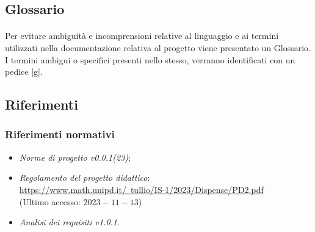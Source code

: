 \documentclass[10pt, a4paper]{article}
\begin{document}
\subsection{Glossario}
\paragraph{}Per evitare ambiguità e incomprensioni relative al linguaggio e ai termini utilizzati nella documentazione relativa al progetto viene presentato un Glossario. I termini ambigui o specifici presenti nello stesso, verranno identificati con un pedice |g|.
\subsection{Riferimenti}

\subsubsection{Riferimenti normativi} 
\begin{itemize}
\item \textit{Norme di progetto v0.0.1(23)};
\item \textit{Regolamento del progetto didattico}: \\
\href{https://www.math.unipd.it/~tullio/IS-1/2023/Dispense/PD2.pdf}{https://www.math.unipd.it/~tullio/IS-1/2023/Dispense/PD2.pdf}\\
(Ultimo accesso: $2023-11-13$)

\item \textit{Analisi dei requisiti v1.0.1}.
\end{itemize}

\end{document}

